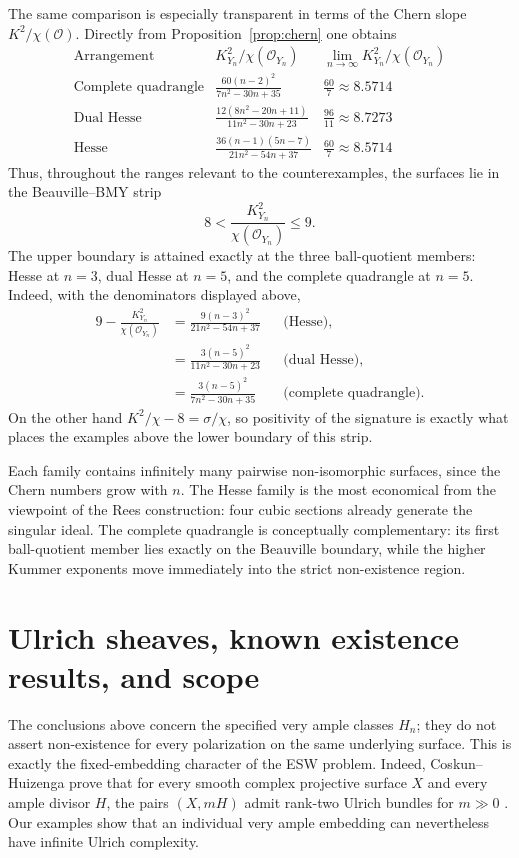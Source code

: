 \documentclass[11pt]{article}
\newcommand{\OO}{\mathcal O}
\newcommand{\sig}{\sigma}
\begin{document}
The same comparison is especially transparent in terms of the Chern slope
$K^2/\chi(\OO)$.  Directly from Proposition~\ref{prop:chern} one obtains
\[
\begin{array}{c|c|c}
\text{Arrangement}
& K_{Y_n}^2/\chi(\OO_{Y_n})
& \displaystyle\lim_{n\to\infty}K_{Y_n}^2/\chi(\OO_{Y_n})\\
\hline
\text{Complete quadrangle}
& \displaystyle\frac{60(n-2)^2}{7n^2-30n+35}
& \displaystyle\frac{60}{7}\approx 8.5714\\[6pt]
\text{Dual Hesse}
& \displaystyle\frac{12(8n^2-20n+11)}{11n^2-30n+23}
& \displaystyle\frac{96}{11}\approx 8.7273\\[6pt]
\text{Hesse}
& \displaystyle\frac{36(n-1)(5n-7)}{21n^2-54n+37}
& \displaystyle\frac{60}{7}\approx 8.5714
\end{array}
\]
Thus, throughout the ranges relevant to the counterexamples, the surfaces lie in
the Beauville--BMY strip
\[
        8<\frac{K_{Y_n}^2}{\chi(\OO_{Y_n})}\le9.
\]
The upper boundary is attained exactly at the three ball-quotient members: Hesse
at $n=3$, dual Hesse at $n=5$, and the complete quadrangle at $n=5$.  Indeed,
with the denominators displayed above,
\[
\begin{aligned}
9-\frac{K_{Y_n}^2}{\chi(\OO_{Y_n})}
&=\frac{9(n-3)^2}{21n^2-54n+37} &&\text{(Hesse)},\\
&=\frac{3(n-5)^2}{11n^2-30n+23} &&\text{(dual Hesse)},\\
&=\frac{3(n-5)^2}{7n^2-30n+35} &&\text{(complete quadrangle)}.
\end{aligned}
\]
On the other hand $K^2/\chi-8=\sig/\chi$, so positivity of the signature is
exactly what places the examples above the lower boundary of this strip.

Each family contains infinitely many pairwise non-isomorphic surfaces, since the
Chern numbers grow with $n$.  The Hesse family is the most economical from the
viewpoint of the Rees construction: four cubic sections already generate the
singular ideal.  The complete quadrangle is conceptually complementary: its
first ball-quotient member lies exactly on the Beauville boundary, while the
higher Kummer exponents move immediately into the strict non-existence region.

\section{Ulrich sheaves, known existence results, and scope}\label{sec:scope}

The conclusions above concern the specified very ample classes $H_n$; they do
not assert non-existence for every polarization on the same underlying surface.
This is exactly the fixed-embedding character of the ESW problem.  Indeed,
Coskun--Huizenga prove that for every smooth complex projective surface $X$ and
every ample divisor $H$, the pairs $(X,mH)$ admit rank-two Ulrich bundles for
$m\gg0$ \cite[Theorem~1.2]{CoskunHuizenga}.  Our examples show that an individual
very ample embedding can nevertheless have infinite Ulrich complexity.
\end{document}
